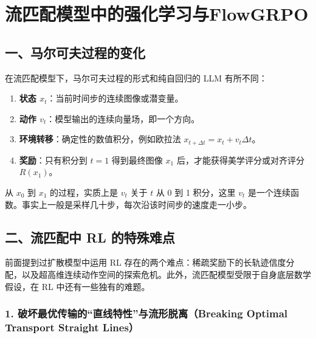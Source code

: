 \clearpage

\hypertarget{ux6d41ux5339ux914dux6a21ux578bux4e2dux7684ux5f3aux5316ux5b66ux4e60ux4e0eflowgrpo}{%
\section{流匹配模型中的强化学习与FlowGRPO}\label{ux6d41ux5339ux914dux6a21ux578bux4e2dux7684ux5f3aux5316ux5b66ux4e60ux4e0eflowgrpo}}

\hypertarget{ux4e00ux9a6cux5c14ux53efux592bux8fc7ux7a0bux7684ux53d8ux5316}{%
\subsection{一、马尔可夫过程的变化}\label{ux4e00ux9a6cux5c14ux53efux592bux8fc7ux7a0bux7684ux53d8ux5316}}

在流匹配模型下，马尔可夫过程的形式和纯自回归的 LLM 有所不同：

\begin{enumerate}
\def\labelenumi{\arabic{enumi}.}
\tightlist
\item
  \textbf{状态 \(x_t\)}：当前时间步的连续图像或潜变量。
\item
  \textbf{动作 \(v_t\)}：模型输出的连续向量场，即一个方向。
\item
  \textbf{环境转移}：确定性的数值积分，例如欧拉法 \(x_{t+\Delta t}=x_t+v_t\Delta t\)。
\item
  \textbf{奖励}：只有积分到 \(t=1\) 得到最终图像 \(x_1\) 后，才能获得美学评分或对齐评分 \(R(x_1)\)。
\end{enumerate}

从 \(x_0\) 到 \(x_1\) 的过程，实质上是 \(v_t\) 关于 \(t\) 从 0 到 1 积分，这里 \(v_t\) 是一个连续函数。事实上一般是采样几十步，每次沿该时间步的速度走一小步。

\hypertarget{ux4e8cux6d41ux5339ux914dux4e2d-rl-ux7684ux7279ux6b8aux96beux70b9}{%
\subsection{二、流匹配中 RL 的特殊难点}\label{ux4e8cux6d41ux5339ux914dux4e2d-rl-ux7684ux7279ux6b8aux96beux70b9}}

前面提到过扩散模型中运用 RL 存在的两个难点：稀疏奖励下的长轨迹信度分配，以及超高维连续动作空间的探索危机。此外，流匹配模型受限于自身底层数学假设，在 RL 中还有一些独有的难题。

\hypertarget{ux7834ux574fux6700ux4f18ux4f20ux8f93ux7684ux76f4ux7ebfux7279ux6027ux4e0eux6d41ux5f62ux8131ux79bbbreaking-optimal-transport-straight-lines}{%
\subsubsection{1. 破坏最优传输的``直线特性''与流形脱离（Breaking Optimal Transport Straight Lines）}\label{ux7834ux574fux6700ux4f18ux4f20ux8f93ux7684ux76f4ux7ebfux7279ux6027ux4e0eux6d41ux5f62ux8131ux79bbbreaking-optimal-transport-straight-lines}}

